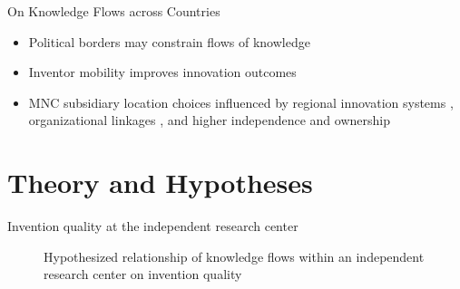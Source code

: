 \documentclass{beamer}
\begin{document}
\begin{frame}{On Knowledge Flows across Countries}{}
\begin{itemize}
\item{Political borders may constrain flows of knowledge \citep{Singh2013}}
\item{Inventor mobility improves innovation outcomes \citep{Alnuaimi2012a}}
\item{MNC subsidiary location choices influenced by regional innovation systems \citep{Andersen2005}, organizational linkages \citep{Zhao2006}, and higher independence and ownership \citep{Pearce1999}}
\end{itemize}
\end{frame}

\section{Theory and Hypotheses}
\begin{frame}{Invention quality at the independent research center}{}
\begin{figure}[h]
\centering
\begin{adjustbox}{width=\textwidth}
\end{adjustbox}
\caption{Hypothesized relationship of knowledge flows within an independent research center on invention quality}
\label{figure:q1}
\end{figure}
\end{frame}
\end{document}
